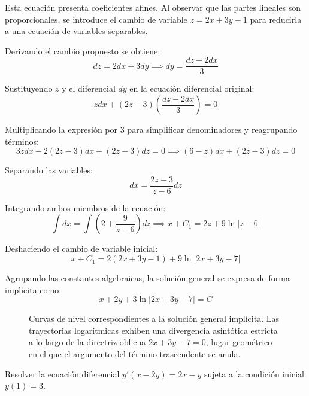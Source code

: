 \begin{tcolorbox}
Esta ecuación presenta coeficientes afines. Al observar que las partes lineales son proporcionales, se introduce el cambio de variable $z = 2x + 3y - 1$ para reducirla a una ecuación de variables separables.

Derivando el cambio propuesto se obtiene:
$$ dz = 2dx + 3dy \implies dy = \frac{dz - 2dx}{3} $$

Sustituyendo $z$ y el diferencial $dy$ en la ecuación diferencial original:
$$ z dx + (2z - 3)\left(\frac{dz - 2dx}{3}\right) = 0 $$

Multiplicando la expresión por 3 para simplificar denominadores y reagrupando términos:
$$ 3z dx - 2(2z - 3)dx + (2z - 3)dz = 0 \implies (6 - z)dx + (2z - 3)dz = 0 $$

Separando las variables:
$$ dx = \frac{2z - 3}{z - 6}dz $$

Integrando ambos miembros de la ecuación:
$$ \int dx = \int \left( 2 + \frac{9}{z - 6} \right) dz \implies x + C_1 = 2z + 9\ln|z - 6| $$

Deshaciendo el cambio de variable inicial:
$$ x + C_1 = 2(2x + 3y - 1) + 9\ln|2x + 3y - 7| $$

Agrupando las constantes algebraicas, la solución general se expresa de forma implícita como:
$$ x + 2y + 3\ln|2x + 3y - 7| = C $$

\begin{figure}[H]
    \centering
    
    \caption{Curvas de nivel correspondientes a la solución general implícita. Las trayectorias logarítmicas exhiben una divergencia asintótica estricta a lo largo de la directriz oblicua $2x + 3y - 7 = 0$, lugar geométrico en el que el argumento del término trascendente se anula.}
\end{figure}
\end{tcolorbox}

\begin{ejercicio}
Resolver la ecuación diferencial $y'(x - 2y) = 2x - y$ sujeta a la condición inicial $y(1) = 3$.
\end{ejercicio}

